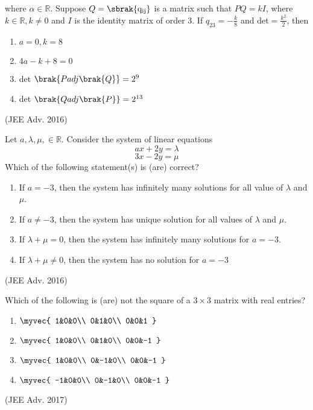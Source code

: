         where $\alpha \in \mathbb{R}$. Suppose $Q= \mathrm{\sbrak{q_{ij}}}$ is a matrix such that $PQ=kI$, where $k \in \mathbb{R}, k \neq 0$ and $I$ is the identity matrix of order $3$. If $q_{23} = -\frac{k}{8}$ and det$= \frac{k^2}{2}$, then
        \begin{enumerate}
            \item $a=0, k=8$
            \item $4a-k+8=0$
            \item det $\brak{P adj \brak{Q}} = 2^9$
            \item det $\brak{Q adj \brak{P}} = 2^{13}$
        \end{enumerate}
        \hfill (JEE Adv. 2016)
    \item
        Let $a, \lambda, \mu, \in \mathbb{R}$. Consider the system of linear equations $$ax+2y=\lambda$$ $$3x-2y=\mu$$ Which of the following statement(s) is (are) correct?
        \begin{enumerate}
            \item If $a=-3$, then the system has infinitely many solutions for all value of $\lambda$ and $\mu$.
            \item If $a \neq -3$, then the system has unique solution for all values of $\lambda$ and $\mu$.
            \item If $\lambda + \mu = 0$, then the system has infinitely many solutions for $a = -3$.
            \item If $\lambda + \mu \neq 0$, then the system has no solution for $a = -3$
        \end{enumerate}
        \hfill (JEE Adv. 2016)
    \item 
        Which of the following is (are) not the square of a $3 \times 3$ matrix with real entries?
            \begin{enumerate}
                \itemsep0.4em
                \item 
                    $\myvec{
                        1&0&0\\
                        0&1&0\\
                        0&0&1
                    }$\\
                \item 
                    $\myvec{
                        1&0&0\\
                        0&1&0\\
                        0&0&-1
                    }$\\
                \item 
                    $\myvec{
                        1&0&0\\
                        0&-1&0\\
                        0&0&-1
                    }$\\
                \item 
                    $\myvec{
                        -1&0&0\\
                        0&-1&0\\
                        0&0&-1
                    }$\\
            \end{enumerate}
            \hfill (JEE Adv. 2017)	

